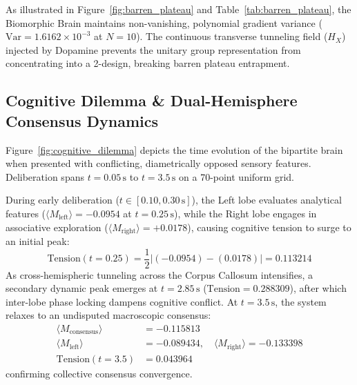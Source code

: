 \documentclass[10pt,twocolumn,3p]{article}
\begin{document}
As illustrated in Figure~\ref{fig:barren_plateau} and Table~\ref{tab:barren_plateau}, the Biomorphic Brain maintains non-vanishing, polynomial gradient variance ($\text{Var} = 1.6162 \times 10^{-3}$ at $N=10$). The continuous transverse tunneling field ($H_X$) injected by Dopamine prevents the unitary group representation from concentrating into a 2-design, breaking barren plateau entrapment.

\subsection{Cognitive Dilemma \& Dual-Hemisphere Consensus Dynamics}
\label{subsec:bench_dilemma}

Figure~\ref{fig:cognitive_dilemma} depicts the time evolution of the bipartite brain when presented with conflicting, diametrically opposed sensory features. Deliberation spans $t = 0.05\,\text{s}$ to $t = 3.5\,\text{s}$ on a 70-point uniform grid.

During early deliberation ($t \in [0.10, 0.30\,\text{s}]$), the Left lobe evaluates analytical features ($\langle M_{\text{left}} \rangle = -0.0954$ at $t = 0.25\,\text{s}$), while the Right lobe engages in associative exploration ($\langle M_{\text{right}} \rangle = +0.0178$), causing cognitive tension to surge to an initial peak:
\begin{equation}
    \text{Tension}(t=0.25) = \frac{1}{2} |(-0.0954) - (0.0178)| = 0.113214
\end{equation}
As cross-hemispheric tunneling across the Corpus Callosum intensifies, a secondary dynamic peak emerges at $t = 2.85\,\text{s}$ ($\text{Tension} = 0.288309$), after which inter-lobe phase locking dampens cognitive conflict. At $t = 3.5\,\text{s}$, the system relaxes to an undisputed macroscopic consensus:
\begin{align}
    \langle M_{\text{consensus}} \rangle &= -0.115813 \\
    \langle M_{\text{left}} \rangle &= -0.089434, \quad \langle M_{\text{right}} \rangle = -0.133398 \\
    \text{Tension}(t=3.5) &= 0.043964
\end{align}
confirming collective consensus convergence.
\end{document}
